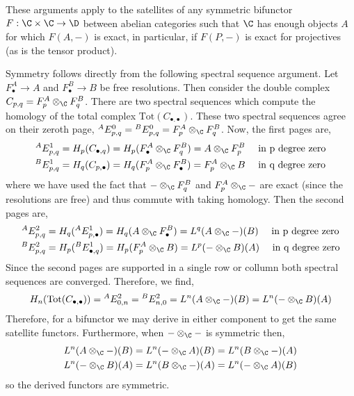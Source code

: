 \documentclass[12pt]{article}
\begin{document}
\begin{remark}
These arguments apply to the satellites of any symmetric bifunctor $F : \C \times \C \to \D$ between abelian categories such that $\C$ has enough objects $A$ for which $F(A, -)$ is exact, in particular, if $F(P, -)$ is exact for projectives (as is the tensor product). 
\end{remark}

\newcommand{\Tot}{\mathrm{Tot}}

\begin{remark}
Symmetry follows directly from the following spectral sequence argument. Let $F^A_\bullet \to A$ and $F^B_\bullet \to B$ be free resolutions. Then consider the double complex $C_{p,q} = F^A_p \otimes_\C F^B_q$. There are two spectral sequences which compute the homology of the total complex $\Tot(C_{\bullet. \bullet})$. These two spectral sequences agree on their zeroth page, ${}^A E^0_{p,q} = {}^B E^0_{p,q} = F^A_p \otimes_\C F^B_q$. Now, the first pages are,
\begin{align*}
{}^A E^1_{p,q} & = H_{p}(C_{\bullet, q}) = H_{p}(F^A_\bullet \otimes_\C F^B_q) = A \otimes_\C F_p^B \quad \text{ in p degree zero}
\\
{}^B E^1_{p,q} & = H_{q}(C_{p, \bullet}) = H_{q}(F^A_p \otimes_\C F^B_\bullet) = F^A_p \otimes_\C B \quad \text{ in q degree zero}
\end{align*}
where we have used the fact that $- \otimes_\C F^B_q$ and $F^A_p \otimes_\C - $ are exact (since the resolutions are free) and thus commute with taking homology. Then the second pages are,
\begin{align*}
{}^A E^2_{p,q} & = H_{q}({}^A E^1_{p, \bullet}) = H_{q}(A \otimes_\C F_\bullet^B) = L^q(A \otimes_\C -)(B) \quad \text{ in p degree zero}
\\
{}^B E^2_{p,q} & = H_{p}({}^B E^1_{\bullet, q}) = H_{p}(F^A_p \otimes_\C B) = L^p (- \otimes_\C B)(A) \quad \text{ in q degree zero}
\end{align*}
Since the second pages are supported in a single row or collumn both spectral sequences are converged. Therefore, we find,
\[ H_n(\Tot(C_{\bullet, \bullet})) = {}^A E^2_{0,n} = {}^B E^2_{n, 0} = L^n(A \otimes_\C -)(B) = L^n(- \otimes_\C B)(A) \] 
Therefore, for a bifunctor we may derive in either component to get the same satellite functors. Furthermore, when $- \otimes_\C -$ is symmetric then, 
\begin{align*}
L^n(A \otimes_\C -)(B) & = L^n(- \otimes_\C A)(B) = L^n(B \otimes_\C -)(A) 
\\
L^n(- \otimes_\C B)(A) & = L^n(B \otimes_\C -)(A) = L^n(- \otimes_\C A)(B) 
\end{align*}
so the derived functors are symmetric.
\end{remark}
\end{document}
